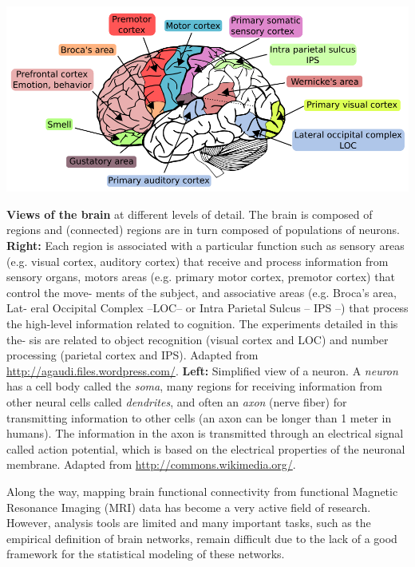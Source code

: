  \begin{pagefigure}
    \centering
    \def\svgwidth{.23\columnwidth}
    
    \includegraphics[width=.74\linewidth]{figures/brain_function.png}    
    \caption{\textbf{Views of the brain} at different levels of detail. The brain is composed of regions and (connected) regions are in turn composed of populations of neurons.
\textbf{Right:} Each region is associated with a particular
function such as sensory areas (e.g.
visual cortex, auditory cortex) that
receive and process information
from sensory organs, motors areas
(e.g. primary motor cortex, premotor cortex) that control the move-
ments of the subject, and associative areas (e.g. Broca’s area, Lat-
eral Occipital Complex --LOC-- or Intra Parietal Sulcus – IPS –)
that process the high-level information related to cognition. The
experiments detailed in this the-
sis are related to object recognition (visual cortex and LOC) and
number processing (parietal cortex and IPS). Adapted from \url{http://agaudi.files.wordpress.com/}.
\textbf{Left:} Simplified view of a neuron.
A \textit{neuron} has a cell body
called the \textit{soma}, many regions for receiving information from other neural cells
called \textit{dendrites}, and often an \textit{axon} (nerve
fiber) for transmitting information to other
cells (an axon can be longer than 1 meter in humans).
The information in the axon is transmitted through an electrical
signal called action potential, which is based on the electrical
properties of the neuronal membrane. Adapted from
\url{http://commons.wikimedia.org/}.
}
\end{pagefigure}

Along the way, mapping brain functional connectivity from functional Magnetic Resonance Imaging (MRI) data has become
a very active field of research. However, analysis tools are limited and many important tasks, such as the empirical
definition of brain networks, remain difficult due to the lack of a good framework for the statistical
modeling of these networks.

